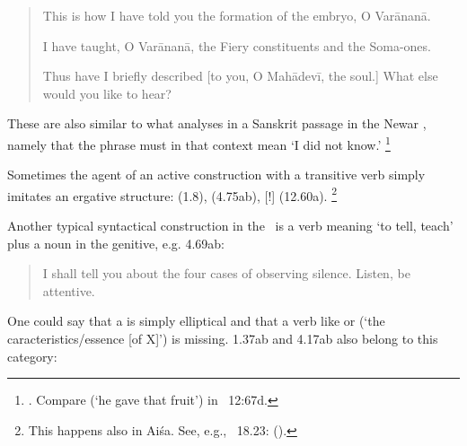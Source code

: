 \begin{quote}

            This is how I have told you the formation of 
            the embryo, O Varānanā.
            

			I have taught, O Varānanā, the Fiery constituents 
			and the Soma-ones.
			

		Thus have I briefly described [to you, O Mahādevī, the soul.] 
		What else would you like to hear?
\end{quote}

\noindent
These are also similar to what \citeauthor{JorgensenVicitra}
analyses in a Sanskrit passage in the Newar
, namely that
the phrase  must in that context 
mean `I did not know.'%
		\footnote{.
						Compare  (`he gave that fruit') in \VSS\ 12:67d.}


Sometimes the agent of an active construction with a transitive verb
simply imitates an ergative structure:  (1.8),
 (4.75ab),
[!]  (12.60a).%
		\footnote{This happens also in Aiśa. See, e.g., \SiddhYogMata\ 18.23: 
		 ().}

\label{tellplusgen}Another typical syntactical construction in the \VSS\ is a verb
meaning `to tell, teach' plus a noun in the genitive, e.g. 4.69ab:

\begin{quote}

        I shall tell you about the four cases of observing silence. 
        Listen, be attentive.
\end{quote}

\noindent
One could say that  a is simply elliptical and that
a verb like  or  
(`the caracteristics/\thinspace essence [of X]') is missing. 1.37ab and 4.17ab
also belong to this category:

